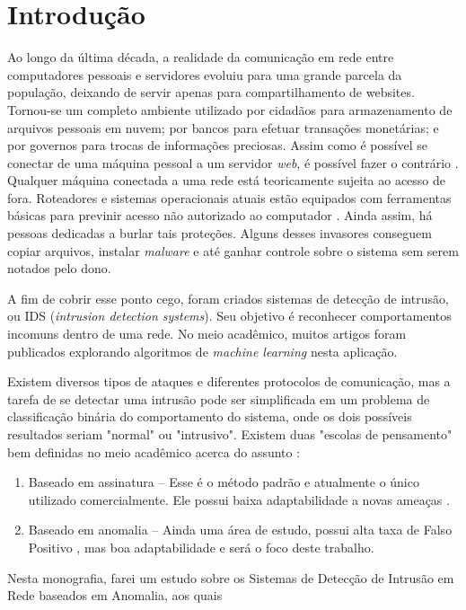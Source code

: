 \chapter{Introdução}
\label{ch:introducao}

Ao longo da última década, a realidade da comunicação em rede entre computadores pessoais e servidores evoluiu
para uma grande parcela da população, deixando de servir apenas para compartilhamento de websites.
Tornou-se um completo ambiente utilizado por cidadãos para armazenamento de arquivos pessoais em nuvem;
por bancos para efetuar transações monetárias; e por governos para trocas de informações preciosas.
Assim como é possível se conectar de uma máquina pessoal a um servidor \textit{web}, é possível fazer o contrário \cite{tsai09}.
Qualquer máquina conectada a uma rede está teoricamente sujeita ao acesso de fora.
Roteadores e sistemas operacionais atuais estão equipados com ferramentas básicas para previnir acesso não autorizado
ao computador \cite{hongjuan10}. Ainda assim, há pessoas dedicadas a burlar tais proteções. Alguns desses invasores conseguem copiar
arquivos, instalar \textit{malware} e até ganhar controle sobre o sistema sem serem notados pelo dono.
\par A fim de cobrir esse ponto cego, foram criados sistemas de detecção de intrusão, ou IDS
(\textit{intrusion detection systems}). Seu objetivo é reconhecer comportamentos incomuns dentro de uma rede.
No meio acadêmico, muitos artigos foram publicados explorando algoritmos de \emph{machine learning} nesta aplicação.
\par Existem diversos tipos de ataques e diferentes protocolos de comunicação, mas a tarefa de se detectar uma
intrusão pode ser simplificada em um problema de classificação binária do comportamento do sistema, onde os dois
possíveis resultados seriam "normal" ou "intrusivo". Existem duas "escolas de pensamento" bem definidas no meio
acadêmico acerca do assunto \cite{tsai09}:
\begin{enumerate}
    \item Baseado em assinatura -- Esse é o método padrão e atualmente o único utilizado
    comercialmente. Ele possui baixa adaptabilidade a novas ameaças \cite{davis11}.
    \item Baseado em anomalia -- Ainda uma área de estudo, possui alta taxa de
    Falso Positivo \cite{catania12}, mas boa adaptabilidade e será o foco deste trabalho.
\end{enumerate}
\par Nesta monografia, farei um estudo sobre os Sistemas de Detecção de Intrusão em Rede baseados em Anomalia, aos quais
